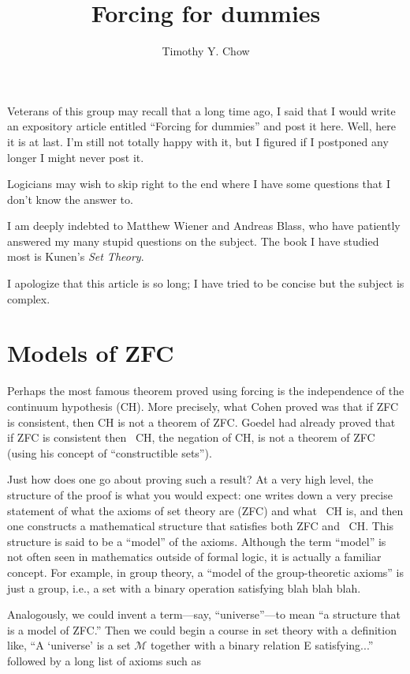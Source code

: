 \documentclass[10pt]{article}
\title{Forcing for dummies}
\author{Timothy Y. Chow}
\date{}
\begin{document}
\maketitle


Veterans of this group may recall that a long time ago, I said that I would write an expository article entitled ``Forcing for dummies'' and post it here. Well, here it is at last. I'm still not totally happy with it, but I figured if I postponed any longer I might never post it. 

Logicians may wish to skip right to the end where I have some questions that I don't know the answer to.

I am deeply indebted to Matthew Wiener and Andreas Blass, who have patiently answered my many stupid questions on the subject. The book I have studied most is Kunen's \textit{Set Theory}. 

I apologize that this article is so long; I have tried to be concise but the subject is complex. 


\section{Models of ZFC}

Perhaps the most famous theorem proved using forcing is the independence of the continuum hypothesis (CH). More precisely, what Cohen proved was that if ZFC is consistent, then CH is not a theorem of ZFC. Goedel had already proved that if ZFC is consistent then ~CH, the negation of CH, is not a theorem of ZFC (using his concept of ``constructible sets'').

Just how does one go about proving such a result? At a very high level, the structure of the proof is what you would expect: one writes down a very precise statement of what the axioms of set theory are (ZFC) and what ~CH is, and then one constructs a mathematical structure that satisfies both ZFC and ~CH. This structure is said to be a ``model'' of the axioms. Although the term ``model'' is not often seen in mathematics outside of formal logic, it is actually a familiar concept. For example, in group theory, a ``model of the group-theoretic axioms'' is just a group, i.e., a set with a binary operation satisfying blah blah blah.

Analogously, we could invent a term---say, ``universe''---to mean ``a structure that is a model of ZFC.'' Then we could begin a course in set theory with a definition like, ``A `universe' is a set $\mathcal{M}$ together with a binary relation E satisfying...'' followed by a long list of axioms such as
\end{document}
